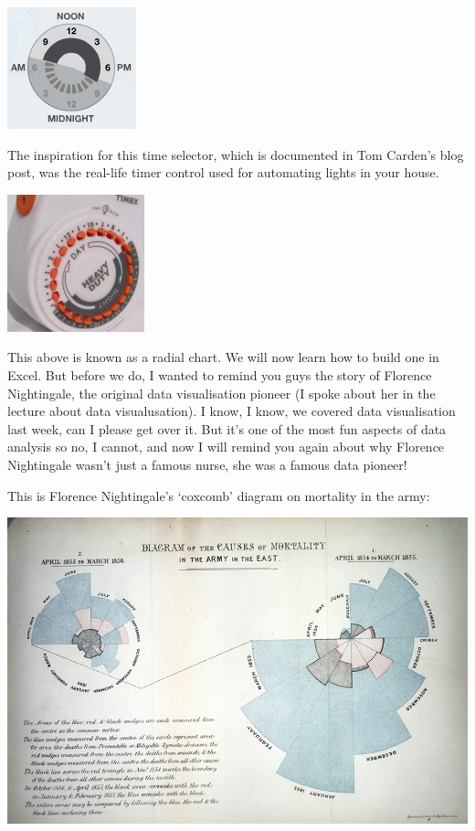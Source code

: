 \documentclass[
]{book}
\begin{document}
\includegraphics{imgs/crimespotting_time_pie.png}

The inspiration for this time selector, which is documented in Tom Carden's blog post, was the real-life timer control used for automating lights in your house.

\includegraphics{imgs/real_life_time_pie-150x150.png}

This above is known as a radial chart. We will now learn how to build one in Excel. But before we do, I wanted to remind you guys the story of Florence Nightingale, the original data visualisation pioneer (I spoke about her in the lecture about data visualusation). I know, I know, we covered data visualisation last week, can I please get over it. But it's one of the most fun aspects of data analysis so no, I cannot, and now I will remind you again about why Florence Nightingale wasn't just a famous nurse, she was a famous data pioneer!

This is Florence Nightingale's `coxcomb' diagram on mortality in the army:

\includegraphics{imgs/FlorenceData900.jpg}
\end{document}

